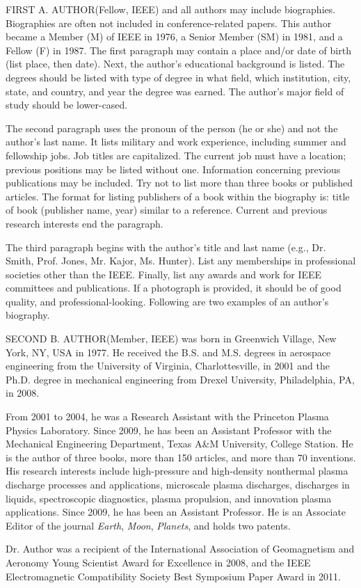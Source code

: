 \documentclass{IEEEojcsys}
\begin{document}
\begin{IEEEbiography}{FIRST A. AUTHOR}{\space}(Fellow, IEEE) and all authors may include biographies. Biographies are often not included in conference-related papers. This author became a Member (M) of IEEE in 1976, a Senior Member (SM) in 1981, and a Fellow (F) in 1987. The first paragraph may contain a place and/or date of birth (list place, then date). Next, the author's educational background is listed. The degrees should be listed with type of degree in what field, which institution, city, state, and country, and year the degree was earned. The author's major field of study should be lower-cased.

The second paragraph uses the pronoun of the person (he or she) and not the author's last name. It lists military and work experience, including summer and fellowship jobs. Job titles are capitalized. The current job must have a location; previous positions may be listed without one. Information concerning previous publications may be included. Try not to list more than three books or published articles. The format for listing publishers of a book within the biography is: title of book (publisher name, year) similar to a reference. Current and previous research interests end the paragraph.

The third paragraph begins with the author's title and last name (e.g., Dr. Smith, Prof. Jones, Mr. Kajor, Ms. Hunter). List any memberships in professional societies other than the IEEE. Finally, list any awards and work for IEEE committees and publications. If a photograph is provided, it should be of good quality, and professional-looking. Following are two examples of an author's biography.
\end{IEEEbiography}

\begin{IEEEbiography}{SECOND B. AUTHOR}{\space}(Member, IEEE) was born in Greenwich Village, New York, NY, USA in 1977. He received the B.S. and M.S. degrees in aerospace engineering from the University of Virginia, Charlottesville, in 2001 and the Ph.D. degree in mechanical engineering from Drexel University, Philadelphia, PA, in 2008.

    From 2001 to 2004, he was a Research Assistant with the Princeton Plasma Physics Laboratory. Since 2009, he has been an Assistant Professor with the Mechanical Engineering Department, Texas A\&M University, College Station. He is the author of three books, more than 150 articles, and more than 70 inventions. His research interests include high-pressure and high-density nonthermal plasma discharge processes and applications, microscale plasma discharges, discharges in liquids, spectroscopic diagnostics, plasma propulsion, and innovation plasma applications. Since  2009,  he  has  been  an  Assistant  Professor. He is an Associate Editor of the journal {\it Earth}, {\it Moon}, {\it Planets}, and holds two patents. 

   Dr. Author was a recipient of the International Association of Geomagnetism and Aeronomy Young Scientist Award for Excellence in 2008, and the IEEE Electromagnetic Compatibility Society Best Symposium Paper Award in 2011.\vadjust{\vfill\pagebreak} 
\end{IEEEbiography}
\end{document}
